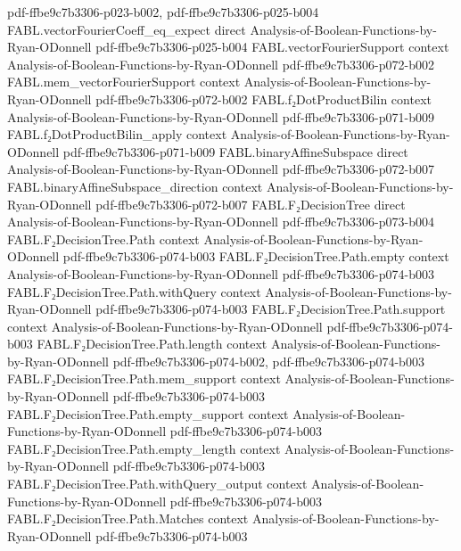 \begin{theorem}
  {pdf-ffbe9c7b3306-p023-b002,
    pdf-ffbe9c7b3306-p025-b004}
\proofstep
  {FABL.vectorFourierCoeff_eq_expect}
  {direct}
  {Analysis-of-Boolean-Functions-by-Ryan-ODonnell}
  {pdf-ffbe9c7b3306-p025-b004}
\proofstep
  {FABL.vectorFourierSupport}
  {context}
  {Analysis-of-Boolean-Functions-by-Ryan-ODonnell}
  {pdf-ffbe9c7b3306-p072-b002}
\proofstep
  {FABL.mem_vectorFourierSupport}
  {context}
  {Analysis-of-Boolean-Functions-by-Ryan-ODonnell}
  {pdf-ffbe9c7b3306-p072-b002}
\proofstep
  {FABL.f₂DotProductBilin}
  {context}
  {Analysis-of-Boolean-Functions-by-Ryan-ODonnell}
  {pdf-ffbe9c7b3306-p071-b009}
\proofstep
  {FABL.f₂DotProductBilin_apply}
  {context}
  {Analysis-of-Boolean-Functions-by-Ryan-ODonnell}
  {pdf-ffbe9c7b3306-p071-b009}
\proofstep
  {FABL.binaryAffineSubspace}
  {direct}
  {Analysis-of-Boolean-Functions-by-Ryan-ODonnell}
  {pdf-ffbe9c7b3306-p072-b007}
\proofstep
  {FABL.binaryAffineSubspace_direction}
  {context}
  {Analysis-of-Boolean-Functions-by-Ryan-ODonnell}
  {pdf-ffbe9c7b3306-p072-b007}
\proofstep
  {FABL.F₂DecisionTree}
  {direct}
  {Analysis-of-Boolean-Functions-by-Ryan-ODonnell}
  {pdf-ffbe9c7b3306-p073-b004}
\proofstep
  {FABL.F₂DecisionTree.Path}
  {context}
  {Analysis-of-Boolean-Functions-by-Ryan-ODonnell}
  {pdf-ffbe9c7b3306-p074-b003}
\proofstep
  {FABL.F₂DecisionTree.Path.empty}
  {context}
  {Analysis-of-Boolean-Functions-by-Ryan-ODonnell}
  {pdf-ffbe9c7b3306-p074-b003}
\proofstep
  {FABL.F₂DecisionTree.Path.withQuery}
  {context}
  {Analysis-of-Boolean-Functions-by-Ryan-ODonnell}
  {pdf-ffbe9c7b3306-p074-b003}
\proofstep
  {FABL.F₂DecisionTree.Path.support}
  {context}
  {Analysis-of-Boolean-Functions-by-Ryan-ODonnell}
  {pdf-ffbe9c7b3306-p074-b003}
\proofstep
  {FABL.F₂DecisionTree.Path.length}
  {context}
  {Analysis-of-Boolean-Functions-by-Ryan-ODonnell}
  {pdf-ffbe9c7b3306-p074-b002,
    pdf-ffbe9c7b3306-p074-b003}
\proofstep
  {FABL.F₂DecisionTree.Path.mem_support}
  {context}
  {Analysis-of-Boolean-Functions-by-Ryan-ODonnell}
  {pdf-ffbe9c7b3306-p074-b003}
\proofstep
  {FABL.F₂DecisionTree.Path.empty_support}
  {context}
  {Analysis-of-Boolean-Functions-by-Ryan-ODonnell}
  {pdf-ffbe9c7b3306-p074-b003}
\proofstep
  {FABL.F₂DecisionTree.Path.empty_length}
  {context}
  {Analysis-of-Boolean-Functions-by-Ryan-ODonnell}
  {pdf-ffbe9c7b3306-p074-b003}
\proofstep
  {FABL.F₂DecisionTree.Path.withQuery_output}
  {context}
  {Analysis-of-Boolean-Functions-by-Ryan-ODonnell}
  {pdf-ffbe9c7b3306-p074-b003}
\proofstep
  {FABL.F₂DecisionTree.Path.Matches}
  {context}
  {Analysis-of-Boolean-Functions-by-Ryan-ODonnell}
  {pdf-ffbe9c7b3306-p074-b003}

\end{theorem}
